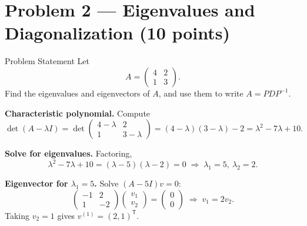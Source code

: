 
\section{Problem 2 --- Eigenvalues and Diagonalization (10 points)}

\begin{problembox}{Problem Statement}
Let
\[
  A = \begin{pmatrix} 4 & 2 \\{} 1 & 3 \end{pmatrix}.
\]
Find the eigenvalues and eigenvectors of $A$, and use them to write
$A = PDP^{-1}$.
\end{problembox}

\begin{steps}

\item \textbf{Characteristic polynomial.} Compute
\[
  \det(A - \lambda I) = \det\begin{pmatrix} 4-\lambda & 2 \\{} 1 & 3-\lambda
  \end{pmatrix} = (4-\lambda)(3-\lambda) - 2 = \lambda^2 - 7\lambda + 10.
\]


\item \textbf{Solve for eigenvalues.} Factoring,
\[
  \lambda^2 - 7\lambda + 10 = (\lambda - 5)(\lambda - 2) = 0
  \;\Longrightarrow\; \lambda_1 = 5,\ \lambda_2 = 2.
\]

\item \textbf{Eigenvector for $\lambda_1 = 5$.} Solve $(A - 5I)v = 0$:
\[
  \begin{pmatrix} -1 & 2 \\{} 1 & -2 \end{pmatrix}
  \begin{pmatrix} v_1 \\{} v_2 \end{pmatrix} = \begin{pmatrix} 0 \\{} 0
  \end{pmatrix} \;\Longrightarrow\; v_1 = 2v_2.
\]
Taking $v_2 = 1$ gives $v^{(1)} = (2, 1)^{\mathsf T}$.



\end{steps}
